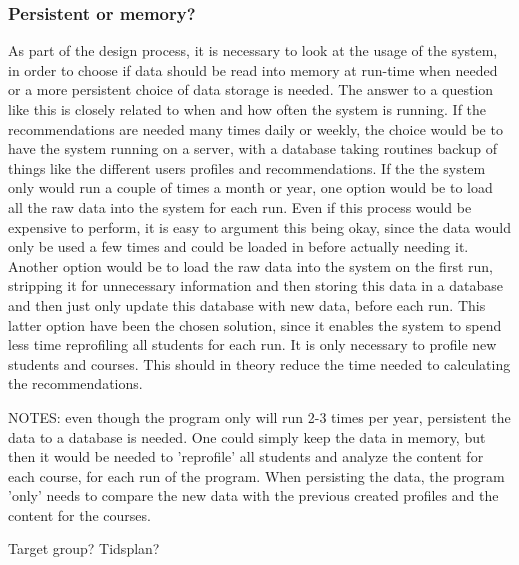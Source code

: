 \subsubsection{Persistent or memory?}
\label{subsec:persistent}
As part of the design process, it is necessary to look at the usage of the system, in order to choose if data should be read into memory at run-time when needed or a more persistent choice of data storage is needed. The answer to a question like this is closely related to when and how often the system is running. If the recommendations are needed many times daily or weekly, the choice would be to have the system running on a server, with a database taking routines backup of things like the different users profiles and recommendations. If the the system only would run a couple of times a month or year, one option would be to load all the raw data into the system for each run. Even if this process would be expensive to perform, it is easy to argument this being okay, since the data would only be used a few times and could be loaded in before actually needing it. Another option would be to load the raw data into the system on the first run, stripping it for unnecessary information and then storing this data in a database and then just only update this database with new data, before each run. This latter option have been the chosen solution, since it enables the system to spend less time reprofiling all students for each run. It is only necessary to profile new students and courses. This should in theory reduce the time needed to calculating the recommendations.

NOTES:
even though the program only will run 2-3 times per year, persistent the data to a database is needed. One could simply keep the data in memory, but then it would be needed to 'reprofile' all students and analyze the content for each course, for each run of the program. When persisting the data, the program 'only' needs to compare the new data with the previous created profiles and the content for the courses.


Target group?
Tidsplan?

